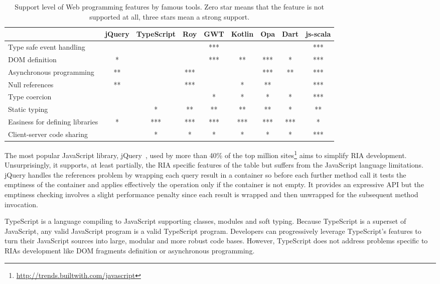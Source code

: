 \documentclass[american,english,runningheads]{llncs}
\begin{document}
\begin{table}
\centering
\begin{tabular}{| l | c | c | c | c | c | c | c | c |}
\hline
& jQuery & TypeScript & Roy & GWT & Kotlin & Opa & Dart & js-scala \\
\hline
Type safe event handling & & & & *** & & & & *** \\
\hline
DOM definition & * & & & *** & ** & *** & * & *** \\
\hline
Asynchronous programming & ** & & *** & & & *** & ** & *** \\
\hline
Null references & ** & & *** & & * & ** & & *** \\
\hline
Type coercion & & & & * & * & * & * & *** \\
\hline
Static typing & & * & ** & ** & ** & ** & * & ** \\
\hline
Easiness for defining libraries & * & *** & *** & *** & *** & *** & *** & * \\
\hline
Client-server code sharing & & * & * & * & * & *  & * & *** \\
\hline
\end{tabular}
\caption{Support level of Web programming features by famous tools. Zero star means that the feature is not supported
at all, three stars mean a strong support.}
\label{comparison}
\end{table}

The most popular JavaScript library, jQuery~\cite{Bibeault08_jQuery}, used by more than 40\% of the top million
sites\footnote{\href{http://trends.builtwith.com/javascript}{http://trends.builtwith.com/javascript}} aims to
simplify RIA development. Unsurprisingly, it supports, at least partially, the RIA specific features of the table but
suffers from the JavaScript language limitations. jQuery handles the  references problem by wrapping each
query result in a container so before each further method call it tests the emptiness of the container and applies
effectively the operation only if the container is not empty. It provides an expressive API but the emptiness
checking involves a slight performance penalty since each result is wrapped and then unwrapped for the subsequent
method invocation.

TypeScript is a language compiling to JavaScript supporting classes, modules and soft typing. Because TypeScript is
a superset of JavaScript, any valid JavaScript program is a valid TypeScript program. Developers can progressively
leverage TypeScript’s features to turn their JavaScript sources into large, modular and more robust code bases.
However, TypeScript does not address problems specific to RIAs development like DOM fragments definition or
asynchronous programming.
\end{document}
